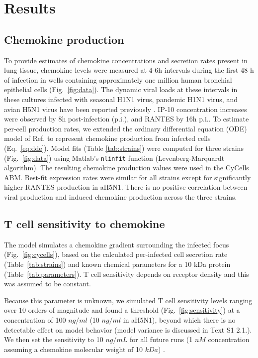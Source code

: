 \documentclass[10pt]{article}
\begin{document}
\section*{Results}

\subsection*{Chemokine production}

To provide estimates of chemokine concentrations and secretion rates present in lung tissue, chemokine levels were measured at 4-6h intervals during the first 48 h of infection in wells containing approximately one million human bronchial epithelial cells (Fig.~\ref{fig:data}).  The dynamic viral loads at these intervals in these cultures infected with seasonal H1N1 virus, pandemic H1N1 virus, and avian H5N1 virus have been reported previously \cite{Mitchell2011}.  IP-10 concentration increases were observed by 8h post-infection (p.i.), and RANTES by 16h p.i..  To estimate per-cell production rates, we extended the ordinary differential equation (ODE) model of Ref. \cite{Mitchell2011} to represent chemokine production from infected cells (Eq.~\ref{eq:dde}).  Model fits (Table \ref{tab:strains}) were computed for three strains (Fig.~\ref{fig:data}) using Matlab's \texttt{nlinfit} function (Levenberg-Marquardt algorithm).  The resulting chemokine production values were used in the CyCells ABM.  Best-fit expression rates were similar for all strains except for significantly higher RANTES production in aH5N1.  There is no positive correlation between viral production and induced chemokine production across the three strains.


\subsection*{T cell sensitivity to chemokine}

The model simulates a chemokine gradient surrounding the infected focus (Fig.~\ref{fig:cycells}), based on the calculated per-infected cell secretion rate (Table~\ref{tab:strains}) and known chemical parameters for a 10 kDa protein (Table~\ref{tab:parameters}).  T cell sensitivity depends on receptor density \cite{Desmetz2006} and this was assumed to be constant.

Because this parameter is unknown, we simulated T cell sensitivity levels ranging over 10 orders of magnitude and found a threshold (Fig.~\ref{fig:sensitivity}) at a concentration of 100 $ng/ml$ (10 $ng/ml$ in aH5N1), beyond which there is no detectable effect on model behavior (model variance is discussed in Text S1 2.1.).  We then set the sensitivity to 10 $ng/mL$ for all future runs (1 $nM$ concentration assuming a chemokine molecular weight of 10 $kDa$) \cite{Gao2003}.  
\end{document}
